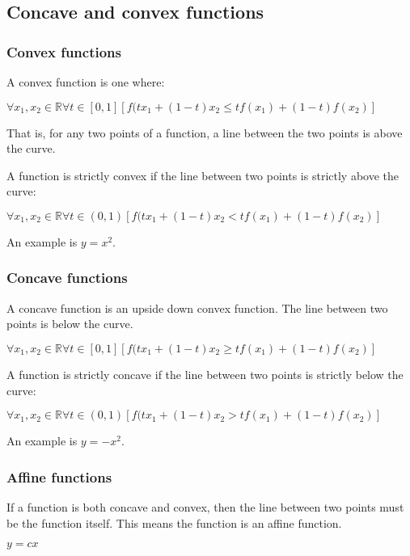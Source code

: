 
\subsection{Concave and convex functions}

\subsubsection{Convex functions}

A convex function is one where:

\(\forall x_1, x_2\in \mathbb{R} \forall t \in [0,1] [f(tx_1+(1-t)x_2 \le tf(x_1)+(1-t)f(x_2)]\)

That is, for any two points of a function, a line between the two points is above the curve.

A function is strictly convex if the line between two points is strictly above the curve:

\(\forall x_1, x_2\in \mathbb{R} \forall t \in (0,1) [f(tx_1+(1-t)x_2 < tf(x_1)+(1-t)f(x_2)]\)

An example is \(y=x^2\).

\subsubsection{Concave functions}

A concave function is an upside down convex function. The line between two points is below the curve.

\(\forall x_1, x_2\in \mathbb{R} \forall t \in [0,1] [f(tx_1+(1-t)x_2 \ge tf(x_1)+(1-t)f(x_2)]\)

A function is strictly concave if the line between two points is strictly below the curve:

\(\forall x_1, x_2\in \mathbb{R} \forall t \in (0,1) [f(tx_1+(1-t)x_2 > tf(x_1)+(1-t)f(x_2)]\)

An example is \(y=-x^2\).

\subsubsection{Affine functions}

If a function is both concave and convex, then the line between two points must be the function itself. This means the function is an affine function.

\(y=cx\)

